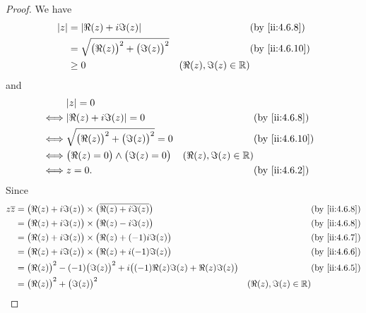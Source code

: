 \begin{proof}
  We have
  \begin{align*}
    \abs{z} & = \abs{\Re(z) + i \Im(z)}                        &                         & \by{ii:4.6.8}  \\
            & = \sqrt{\big(\Re(z)\big)^2 + \big(\Im(z)\big)^2} &                         & \by{ii:4.6.10} \\
            & \geq 0                                           & (\Re(z), \Im(z) \in \R)
  \end{align*}
  and
  \begin{align*}
         & \abs{z} = 0                                                                                   \\
    \iff & \abs{\Re(z) + i \Im(z)} = 0                        &                         & \by{ii:4.6.8}  \\
    \iff & \sqrt{\big(\Re(z)\big)^2 + \big(\Im(z)\big)^2} = 0 &                         & \by{ii:4.6.10} \\
    \iff & \big(\Re(z) = 0\big) \land \big(\Im(z) = 0\big)    & (\Re(z), \Im(z) \in \R)                  \\
    \iff & z = 0.                                             &                         & \by{ii:4.6.2}
  \end{align*}
  Since
  \begin{align*}
    z \overline{z} & = \big(\Re(z) + i \Im(z)\big) \times \big(\overline{\Re(z) + i \Im(z)}\big)                     &                                         & \by{ii:4.6.8}  \\
                   & = \big(\Re(z) + i \Im(z)\big) \times \big(\Re(z) - i \Im(z)\big)                                &                                         & \by{ii:4.6.8}  \\
                   & = \big(\Re(z) + i \Im(z)\big) \times \big(\Re(z) + (-1) i \Im(z)\big)                           &                                         & \by{ii:4.6.7}  \\
                   & = \big(\Re(z) + i \Im(z)\big) \times \big(\Re(z) + i (-1) \Im(z)\big)                           &                                         & \by{ii:4.6.6}  \\
                   & = \big(\Re(z)\big)^2 - (-1) \big(\Im(z)\big)^2 + i \big((-1) \Re(z) \Im(z) + \Re(z) \Im(z)\big) &                                         & \by{ii:4.6.5}  \\
                   & = \big(\Re(z)\big)^2 + \big(\Im(z)\big)^2                                                       & (\Re(z), \Im(z) \in \R)                                  \\

\end{align*}
\end{proof}
